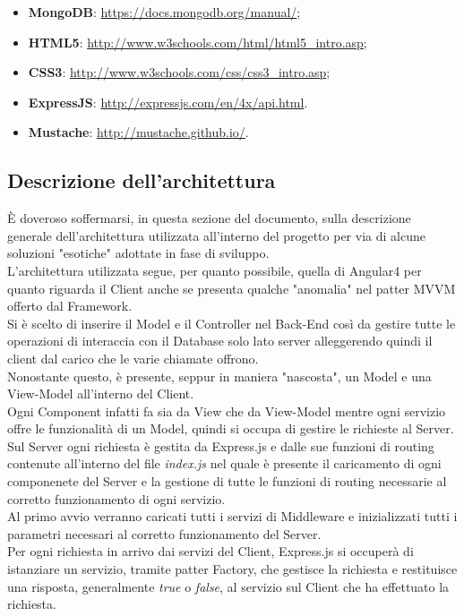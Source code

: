 \begin{itemize}
\item\textbf{ MongoDB}: \url{https://docs.mongodb.org/manual/};
\item \textbf{HTML5}: \url{http://www.w3schools.com/html/html5_intro.asp};
\item \textbf{CSS3}: \url{http://www.w3schools.com/css/css3_intro.asp};

\item \textbf{ExpressJS}: \url{http://expressjs.com/en/4x/api.html}.

\item \textbf{Mustache}: \url{http://mustache.github.io/}.
\end{itemize}

\subsection{Descrizione dell'architettura}
  È doveroso soffermarsi, in questa sezione del documento, sulla descrizione generale dell'architettura utilizzata all'interno del
  progetto per via di alcune soluzioni "esotiche" adottate in fase di sviluppo.\\
  L'architettura utilizzata segue, per quanto possibile, quella di Angular4 per quanto riguarda il Client anche se presenta qualche "anomalia" nel
  patter MVVM offerto dal Framework.\\
  Si è scelto di inserire il Model e il Controller nel Back-End così da gestire tutte le operazioni di interaccia con il Database solo lato server
  alleggerendo quindi il client dal carico che le varie chiamate offrono.\\
  Nonostante questo, è presente, seppur in maniera "nascosta", un Model e una View-Model all'interno del Client.\\
  Ogni Component infatti fa sia da View che da View-Model mentre ogni servizio offre le funzionalità di un Model, quindi si occupa di
  gestire le richieste al Server.\\
  Sul Server ogni richiesta è gestita da Express.js e dalle sue funzioni di routing contenute all'interno del file \emph{index.js} nel quale è presente il
  caricamento di ogni componenete del Server e la gestione di tutte le funzioni di routing necessarie al corretto funzionamento di ogni servizio.\\
  Al primo avvio verranno caricati tutti i servizi di Middleware e inizializzati tutti i parametri necessari al corretto funzionamento del Server.\\
  Per ogni richiesta in arrivo dai servizi del Client, Express.js si occuperà di istanziare un servizio, tramite patter Factory, che gestisce la richiesta e
  restituisce una risposta, generalmente \emph{true} o \emph{false}, al servizio sul Client che ha effettuato la richiesta.\\
